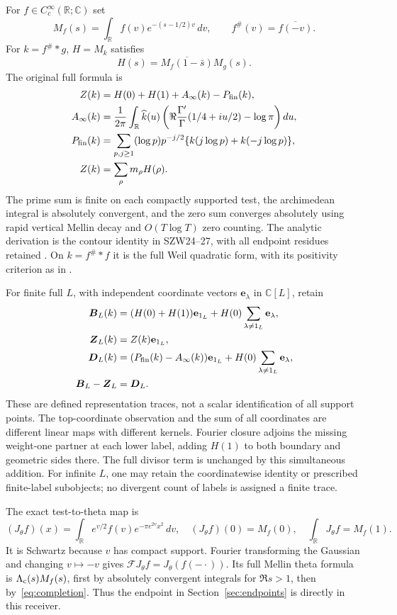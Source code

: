 \documentclass[11pt,a4paper]{article}
\theoremstyle{definition}\newtheorem{definition}[theorem]{Definition}\newtheorem{remark}[theorem]{Remark}
\newcommand{\C}{\mathbb C}\newcommand{\R}{\mathbb R}\newcommand{\Z}{\mathbb Z}\newcommand{\B}{\mathbb B}
\begin{document}
For $f\in C_c^\infty(\R;\C)$ set
\[
 M_f(s)=\int_\R f(v)e^{-(s-1/2)v}\,dv,\qquad f^\#(v)=\overline{f(-v)}.
\]
For $k=f^\#*g$, $H=M_k$ satisfies
\[
 H(s)=\overline{M_f(1-\bar s)}M_g(s).
\]
The original full formula is
\begin{align}
 Z(k)&=H(0)+H(1)+A_\infty(k)-P_{\rm fin}(k),             \label{eq:weil}\\
 A_\infty(k)&=\frac1{2\pi}\int_\R\widehat k(u)
       \left(\Re\frac{\Gamma'}{\Gamma}(1/4+iu/2)-\log\pi\right)du,\notag\\
 P_{\rm fin}(k)&=\sum_{p,j\ge1}(\log p)p^{-j/2}
       \{k(j\log p)+k(-j\log p)\},\notag\\
 Z(k)&=\sum_\rho m_\rho H(\rho).\notag
\end{align}
The prime sum is finite on each compactly supported test, the archimedean integral is absolutely convergent, and the zero sum converges absolutely using rapid vertical Mellin decay and $O(T\log T)$ zero counting. The analytic derivation is the contour identity in SZW24--27, with all endpoint residues retained \cite{SZW,Connes}. On $k=f^\#*f$ it is the full Weil quadratic form, with its positivity criterion as in \cite{CCM}.

For finite full $L$, with independent coordinate vectors $\mathbf e_\lambda$ in $\C[L]$, retain
\begin{align}
 \boldsymbol B_L(k)&=(H(0)+H(1))\mathbf e_{1_L}
                 +H(0)\sum_{\lambda\ne1_L}\mathbf e_\lambda,\notag\\
 \boldsymbol Z_L(k)&=Z(k)\mathbf e_{1_L},\notag\\
 \boldsymbol D_L(k)&=(P_{\rm fin}(k)-A_\infty(k))\mathbf e_{1_L}
                 +H(0)\sum_{\lambda\ne1_L}\mathbf e_\lambda,\notag\\
 \boldsymbol B_L-\boldsymbol Z_L&=\boldsymbol D_L.         \label{eq:fullweil}
\end{align}
These are defined representation traces, not a scalar identification of all support points. The top-coordinate observation and the sum of all coordinates are different linear maps with different kernels. Fourier closure adjoins the missing weight-one partner at each lower label, adding $H(1)$ to both boundary and geometric sides there. The full divisor term is unchanged by this simultaneous addition. For infinite $L$, one may retain the coordinatewise identity or prescribed finite-label subobjects; no divergent count of labels is assigned a finite trace.

The exact test-to-theta map is
\begin{equation}
 (J_\theta f)(x)=\int_\R e^{v/2}f(v)e^{-\pi e^{2v}x^2}\,dv,
 \quad (J_\theta f)(0)=M_f(0),\quad\int_\R J_\theta f=M_f(1).
                                                        \label{eq:testtheta}
\end{equation}
It is Schwartz because $v$ has compact support. Fourier transforming the Gaussian and changing $v\mapsto-v$ gives
$\mathcal FJ_\theta f=J_\theta(f(-\cdot))$. Its full Mellin theta formula is $\Lambda_{\rm c}(s)M_f(s)$, first by absolutely convergent integrals for $\Re s>1$, then by~\eqref{eq:completion}. Thus the endpoint in Section~\ref{sec:endpoints} is directly in this receiver.
\end{document}
